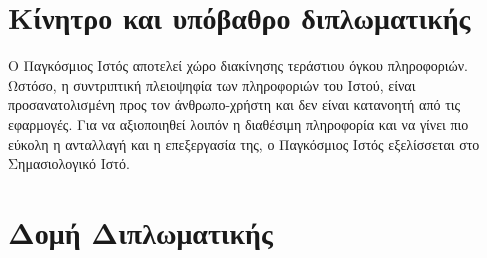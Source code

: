\section{Κίνητρο και υπόβαθρο διπλωματικής}
Ο Παγκόσμιος Ιστός αποτελεί χώρο διακίνησης τεράστιου όγκου
πληροφοριών. Ωστόσο, η συντριπτική πλειοψηφία των πληροφοριών του
Ιστού, είναι προσανατολισμένη προς τον άνθρωπο-χρήστη και δεν
είναι κατανοητή από τις εφαρμογές. Για να αξιοποιηθεί λοιπόν η
διαθέσιμη πληροφορία και να γίνει πιο εύκολη η ανταλλαγή και η
επεξεργασία της, ο Παγκόσμιος Ιστός εξελίσσεται στο Σημασιολογικό
Ιστό.
\section{Δομή Διπλωματικής}
